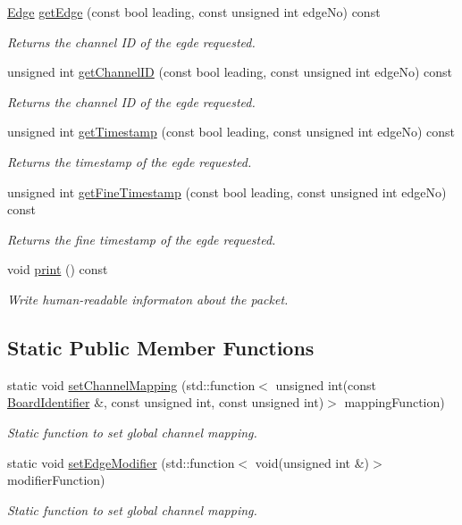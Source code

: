 \begin{DoxyCompactItemize}
\hyperlink{class_edge}{Edge} \hyperlink{class_packet_a457fdd6c0e5cdb161a77550203504e6d}{get\+Edge} (const bool leading, const unsigned int edge\+No) const
\begin{DoxyCompactList}\small\item\em Returns the channel ID of the egde requested. \end{DoxyCompactList}\item 
unsigned int \hyperlink{class_packet_a8a767973ff4b30b417716bbb071ccf33}{get\+Channel\+ID} (const bool leading, const unsigned int edge\+No) const
\begin{DoxyCompactList}\small\item\em Returns the channel ID of the egde requested. \end{DoxyCompactList}\item 
unsigned int \hyperlink{class_packet_a7a15b0965a125dd8441297007581c637}{get\+Timestamp} (const bool leading, const unsigned int edge\+No) const
\begin{DoxyCompactList}\small\item\em Returns the timestamp of the egde requested. \end{DoxyCompactList}\item 
unsigned int \hyperlink{class_packet_aafbf1d7b7303ef5f3919e7ed9f8065f8}{get\+Fine\+Timestamp} (const bool leading, const unsigned int edge\+No) const
\begin{DoxyCompactList}\small\item\em Returns the fine timestamp of the egde requested. \end{DoxyCompactList}\item 
void \hyperlink{class_packet_aec87fc2f2473111a694ad8b6f60e7666}{print} () const
\begin{DoxyCompactList}\small\item\em Write human-\/readable informaton about the packet. \end{DoxyCompactList}\end{DoxyCompactItemize}
\subsection*{Static Public Member Functions}
\begin{DoxyCompactItemize}
\item 
static void \hyperlink{class_packet_a7aaddc94f0d5020e68e7d93daf2f22a1}{set\+Channel\+Mapping} (std\+::function$<$ unsigned int(const \hyperlink{class_board_identifier}{Board\+Identifier} \&, const unsigned int, const unsigned int)$>$ mapping\+Function)
\begin{DoxyCompactList}\small\item\em Static function to set global channel mapping. \end{DoxyCompactList}\item 
static void \hyperlink{class_packet_aa36c09e150aa9ff144365a88cdb3edfd}{set\+Edge\+Modifier} (std\+::function$<$ void(unsigned int \&)$>$ modifier\+Function)
\begin{DoxyCompactList}\small\item\em Static function to set global channel mapping. \end{DoxyCompactList}\end{DoxyCompactItemize}
